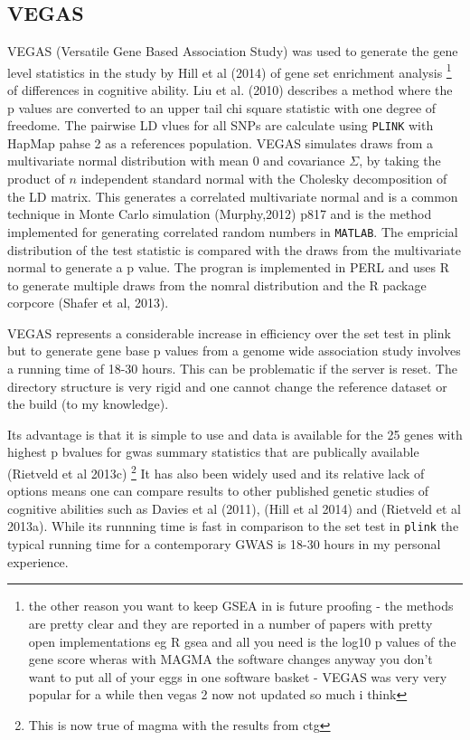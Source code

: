 \subsection{VEGAS}
VEGAS (Versatile Gene Based Association Study) was used to generate the gene level statistics in the study by Hill et al (2014) of gene set enrichment analysis \footnote{the other reason you want to keep GSEA in is future proofing - the methods are pretty clear and they are reported in a number of papers with pretty open implementations eg R gsea and all you need is the log10 p values of the gene score wheras with MAGMA the software changes anyway you don't want to put all of your eggs in one software basket - VEGAS was very very popular for a while then vegas 2 now not updated so much i think} of differences in cognitive ability. Liu et al. (2010) describes a method where the p values are converted to an upper tail chi square statistic with one degree of freedome. The pairwise LD vlues for all SNPs are calculate using \texttt{PLINK} with HapMap pahse 2 as a references population. VEGAS simulates draws from a multivariate normal distribution with mean 0 and covariance $\Sigma$, by taking the product of $n$ independent standard normal with the Cholesky decomposition of the LD matrix. This generates a correlated multivariate normal and is a common technique in Monte Carlo simulation (Murphy,2012) p817 and is the method implemented for generating correlated random numbers in \texttt{MATLAB}. The empricial distribution of the test statistic is compared with the draws from the multivariate normal to generate a p value. The progran is implemented in PERL and uses R to generate multiple draws from the nomral distribution and the R package corpcore (Shafer et al, 2013).

VEGAS represents a considerable increase in efficiency over the set test in plink but to generate gene base p values from a genome wide association study involves a running time of 18-30 hours. This can be problematic if the server is reset. The directory structure is very rigid and one cannot change the reference dataset or the build (to my knowledge). 

Its advantage is that it is simple to use and data is available for the 25 genes with highest p bvalues for gwas summary statistics that are publically available (Rietveld et al 2013c) \footnote{This is now true of magma with the results from ctg} It has also been widely used and its relative lack of options means one can compare results to other published genetic studies of cognitive abilities such as Davies et al (2011), (Hill et al 2014) and (Rietveld et al 2013a). While its runnning time is fast in comparison to the set test in \texttt{plink} the typical running time for a contemporary GWAS is 18-30 hours in my personal experience.

